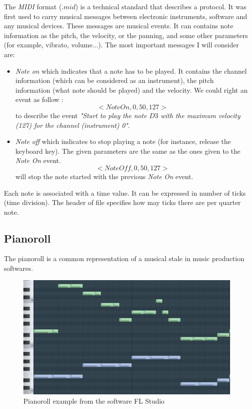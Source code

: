 \documentclass[12pt]{report}
\begin{document}

The \textit{MIDI} format ($.mid$) is a technical standard that describes a protocol.
It was first used to carry musical messages between electronic instruments, software and any musical devices.
These messages are musical events. It can contains note information as the pitch,  the velocity, or the panning, and some other parameters (for example, vibrato, volume...). 
The most important messages I will consider are:
\begin{itemize}
    \item \textit{Note on} which indicates that a note has to be played. It contains the channel information (which can be considered as an instrument), the pitch information (what note should be played) and the velocity. We could right an event as follow :
    \begin{equation}
        <NoteOn, 0, 50, 127>
    \end{equation}
    to describe the event \textit{"Start to play the note $D3$ with the maximum velocity (127) for the channel (instrument) 0"}.
    \item \textit{Note off} which indicates to stop playing a note (for instance, release the keyboard key). The given parameters are the same as the ones given to the \textit{Note On} event.
    \begin{equation}
        <NoteOff, 0, 50, 127>
    \end{equation}
    will stop the note started with the previous \textit{Note On} event.
\end{itemize}

Each note is associated with a time value.
It can be expressed in number of ticks (time division). The header of file specifies how may ticks there are per quarter note.

\subsection{Pianoroll}

The pianoroll is a common representation of a musical stale in music production softwares.

\begin{figure}[H]
    \centering
    \includegraphics[width=0.75 \textwidth]{images/music/pianoroll/pianoroll_flstudio.jpg}
    \caption{Pianoroll example from the software FL Studio \cite{noauthor_fl_nodate}}
    \label{fig:pianoroll_flstudio}
\end{figure}
\end{document}
